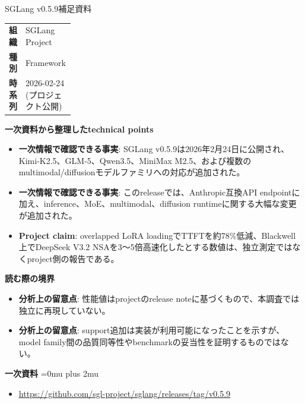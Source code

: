 \begin{technicalnote}{SGLang v0.5.9}{補足資料}
\begingroup
\begin{tabularx}{\linewidth}{@{}>{\bfseries}p{0.22\linewidth}X@{}}
組織 & SGLang Project \\
種別 & Framework \\
時系列 & 2026-02-24 (プロジェクト公開) \\
\end{tabularx}
\smallskip
{\bfseries 一次資料から整理したtechnical points}
\begin{itemize}[leftmargin=1.5em,itemsep=0.35em]
\item \textbf{一次情報で確認できる事実}: SGLang v0.5.9は2026年2月24日に公開され、Kimi-K2.5、GLM-5、Qwen3.5、MiniMax M2.5、および複数のmultimodal/diffusionモデルファミリへの対応が追加された。
\item \textbf{一次情報で確認できる事実}: このreleaseでは、Anthropic互換API endpointに加え、inference、MoE、multimodal、diffusion runtimeに関する大幅な変更が追加された。
\item \textbf{Project claim}: overlapped LoRA loadingでTTFTを約78\%低減、Blackwell上でDeepSeek V3.2 NSAを3〜5倍高速化したとする数値は、独立測定ではなくproject側の報告である。
\end{itemize}
\begin{minipage}{\linewidth}
{\bfseries 読む際の境界}
\begin{itemize}[leftmargin=1.5em,itemsep=0.35em]
\item \textbf{分析上の留意点}: 性能値はprojectのrelease noteに基づくもので、本調査では独立に再現していない。
\item \textbf{分析上の留意点}: support追加は実装が利用可能になったことを示すが、model family間の品質同等性やbenchmarkの妥当性を証明するものではない。
\end{itemize}
\begin{samepage}
{\bfseries 一次資料}
\begingroup\sloppy
\Urlmuskip=0mu plus 2mu\relax
\begin{itemize}[leftmargin=1.5em,itemsep=0.25em]
\item {\scriptsize\url{https://github.com/sgl-project/sglang/releases/tag/v0.5.9}}
\end{itemize}
\endgroup
\end{samepage}
\end{minipage}
\endgroup
\end{technicalnote}
\medskip

